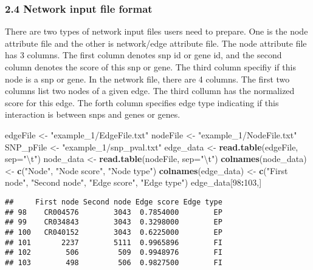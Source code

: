 \documentclass[]{article}
\newenvironment{Shaded}{\begin{snugshade}}{\end{snugshade}}
\newcommand{\KeywordTok}[1]{\textcolor[rgb]{0.13,0.29,0.53}{\textbf{#1}}}
\newcommand{\DataTypeTok}[1]{\textcolor[rgb]{0.13,0.29,0.53}{#1}}
\newcommand{\DecValTok}[1]{\textcolor[rgb]{0.00,0.00,0.81}{#1}}
\newcommand{\CharTok}[1]{\textcolor[rgb]{0.31,0.60,0.02}{#1}}
\newcommand{\StringTok}[1]{\textcolor[rgb]{0.31,0.60,0.02}{#1}}
\newcommand{\OperatorTok}[1]{\textcolor[rgb]{0.81,0.36,0.00}{\textbf{#1}}}
\newcommand{\NormalTok}[1]{#1}
\begin{document}
\subsubsection{2.4 Network input file
format}\label{network-input-file-format}

There are two types of network input files users need to prepare. One is
the node attribute file and the other is network/edge attribute file.
The node attribute file has 3 columns. The first column denotes snp id
or gene id, and the second column denotes the score of this snp or gene.
The third column specifiy if this node is a snp or gene. In the network
file, there are 4 columns. The first two columns list two nodes of a
given edge. The third collumn has the normalized score for this edge.
The forth column specifies edge type indicating if this interaction is
between snps and genes or genes.

\begin{Shaded}
\begin{Highlighting}[]
\NormalTok{edgeFile <-}\StringTok{ "example_1/EdgeFile.txt"}
\NormalTok{nodeFile <-}\StringTok{ "example_1/NodeFile.txt"}
\NormalTok{SNP_pFile <-}\StringTok{ "example_1/snp_pval.txt"}
\NormalTok{edge_data <-}\StringTok{ }\KeywordTok{read.table}\NormalTok{(edgeFile, }\DataTypeTok{sep=}\StringTok{"}\CharTok{\textbackslash{}t}\StringTok{"}\NormalTok{)}
\NormalTok{node_data   <-}\StringTok{ }\KeywordTok{read.table}\NormalTok{(nodeFile, }\DataTypeTok{sep=}\StringTok{"}\CharTok{\textbackslash{}t}\StringTok{"}\NormalTok{)}
\KeywordTok{colnames}\NormalTok{(node_data) <-}\StringTok{ }\KeywordTok{c}\NormalTok{(}\StringTok{"Node"}\NormalTok{, }\StringTok{"Node score"}\NormalTok{, }\StringTok{"Node type"}\NormalTok{)}
\KeywordTok{colnames}\NormalTok{(edge_data) <-}\StringTok{ }\KeywordTok{c}\NormalTok{(}\StringTok{"First node"}\NormalTok{, }\StringTok{"Second node"}\NormalTok{, }\StringTok{"Edge score"}\NormalTok{, }\StringTok{"Edge type"}\NormalTok{)}
\NormalTok{edge_data[}\DecValTok{98}\OperatorTok{:}\DecValTok{103}\NormalTok{,]}
\end{Highlighting}
\end{Shaded}

\begin{verbatim}
##     First node Second node Edge score Edge type
## 98    CR004576        3043  0.7854000        EP
## 99    CR034843        3043  0.3298000        EP
## 100   CR040152        3043  0.6225000        EP
## 101       2237        5111  0.9965896        FI
## 102        506         509  0.9948976        FI
## 103        498         506  0.9827500        FI
\end{verbatim}
\end{document}
